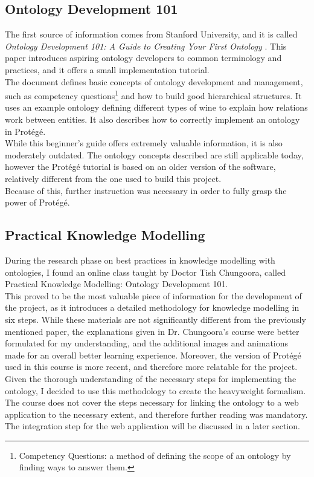 \documentclass[12pt]{report}
\begin{document}
	\subsection{Ontology Development 101}
	The first source of information comes from Stanford University, and it is called \emph{Ontology Development 101: A Guide to Creating Your First Ontology} \cite{onto101}. This paper introduces aspiring ontology developers to common terminology and practices, and it offers a small implementation tutorial.\\
	The document defines basic concepts of ontology development and management, such as competency questions\footnote{Competency Questions: a method of defining the scope of an ontology by finding ways to answer them.} and how to build good hierarchical structures. It uses an example ontology defining different types of wine to explain how relations work between entities. It also describes how to correctly implement an ontology in Protégé.\\
	While this beginner's guide offers extremely valuable information, it is also moderately outdated. The ontology concepts described are still applicable today, however the Protégé tutorial is based on an older version of the software, relatively different from the one used to build this project.\\
	Because of this, further instruction was necessary in order to fully grasp the power of Protégé.
	\subsection{Practical Knowledge Modelling}
	During the research phase on best practices in knowledge modelling with ontologies, I found an online class taught by Doctor Tish Chungoora, called Practical Knowledge Modelling: Ontology Development 101. \cite{udemycourse}\\
	This proved to be the most valuable piece of information for the development of the project, as it introduces a detailed methodology for knowledge modelling in six steps. While these materials are not significantly different from the previously mentioned paper, the explanations given in Dr. Chungoora's course were better formulated for my understanding, and the additional images and animations made for an overall better learning experience. Moreover, the version of Protégé used in this course is more recent, and therefore more relatable for the project.\\
	Given the thorough understanding of the necessary steps for implementing the ontology, I decided to use this methodology to create the heavyweight formalism.\\
	The course does not cover the steps necessary for linking the ontology to a web application to the necessary extent, and therefore further reading was mandatory. The integration step for the web application will be discussed in a later section.
\end{document}
